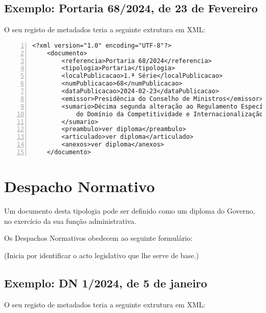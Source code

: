 \subsection{Exemplo: Portaria 68/2024, de 23 de Fevereiro} 
    
O seu registo de metadados teria a seguinte extrutura em XML:
    
\begin{Verbatim}[frame=single, numbers=left, fontsize=\small, commandchars=\\\{\}]
<?xml version="1.0" encoding="UTF-8"?>
    <documento>
        <referencia>Portaria 68/2024</referencia>
        <tipologia>Portaria</tipologia>
        <localPublicacao>1.ª Série</localPublicacao>
        <numPublicacao>68</numPublicacao>
        <dataPublicacao>2024-02-23</dataPublicacao>
        <emissor>Presidência do Conselho de Ministros</emissor>
        <sumario>Décima segunda alteração ao Regulamento Específico 
            do Domínio da Competitividade e Internacionalização
        </sumario>
        <preambulo>ver diploma</preambulo>
        <articulado>ver diploma</articulado>
        <anexos>ver diploma</anexos>
    </documento>
\end{Verbatim}


\section{Despacho Normativo}

Um documento desta tipologia pode ser definido como um diploma do Governo, 
no exercício da sua função administrativa. 

Os Despachos Normativos obedecem ao seguinte formulário:

\begin{quoting}
    (Inicia por identificar o acto legislativo que lhe serve de base.)
\end{quoting}


\subsection{Exemplo: DN 1/2024, de 5 de janeiro} 
    
O seu registo de metadados teria a seguinte extrutura em XML:
    
